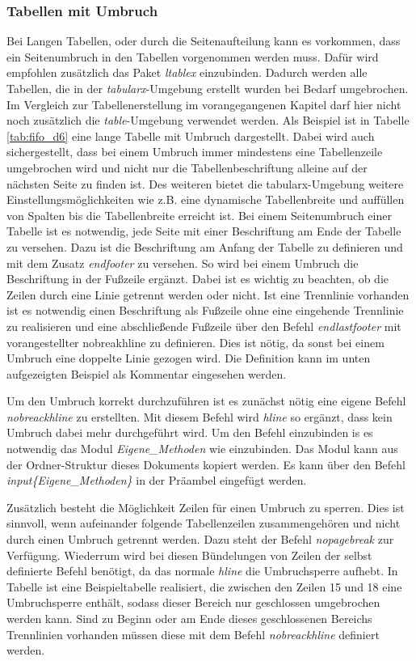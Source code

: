 		\subsubsection{Tabellen mit Umbruch}
		Bei Langen Tabellen, oder durch die Seitenaufteilung kann es vorkommen, dass ein Seitenumbruch in den Tabellen vorgenommen werden muss. Dafür wird empfohlen zusätzlich das Paket \textit{ltablex} einzubinden. Dadurch werden alle Tabellen, die in der \textit{tabularx}-Umgebung erstellt wurden bei Bedarf umgebrochen. Im Vergleich zur Tabellenerstellung im vorangegangenen Kapitel darf hier nicht noch zusätzlich die \textit{table}-Umgebung verwendet werden. Als Beispiel ist in Tabelle \ref{tab:fifo_d6} eine lange Tabelle mit Umbruch dargestellt. Dabei wird auch sichergestellt, dass bei einem Umbruch immer mindestens eine Tabellenzeile umgebrochen wird und nicht nur die Tabellenbeschriftung alleine auf der nächsten Seite zu finden ist. Des weiteren bietet die  tabularx-Umgebung weitere Einstellungsmöglichkeiten wie z.B. eine dynamische Tabellenbreite und auffüllen von Spalten bis die Tabellenbreite erreicht ist. Bei einem Seitenumbruch einer Tabelle ist es notwendig, jede Seite mit einer Beschriftung am Ende der Tabelle zu versehen. Dazu ist die Beschriftung am Anfang der Tabelle zu definieren und mit dem Zusatz \textit{endfooter} zu versehen. So wird bei einem Umbruch die Beschriftung in der Fußzeile ergänzt. Dabei ist es wichtig zu beachten, ob die Zeilen durch eine Linie getrennt werden oder nicht. Ist eine Trennlinie vorhanden ist es notwendig einen Beschriftung als Fußzeile ohne eine eingehende Trennlinie zu realisieren und eine abschließende Fußzeile über den Befehl \textit{endlastfooter} mit vorangestellter nobreakhline zu definieren. Dies ist nötig, da sonst bei einem Umbruch eine doppelte Linie gezogen wird. Die Definition kann im unten aufgezeigten Beispiel als Kommentar eingesehen werden.

		Um den Umbruch korrekt durchzuführen ist es zunächst nötig eine eigene Befehl \textit{nobreackhline} zu erstellten. Mit diesem Befehl wird \textit{hline} so ergänzt, dass kein Umbruch dabei mehr durchgeführt wird. Um den Befehl einzubinden is es notwendig das Modul \textit{Eigene\_Methoden} wie einzubinden. Das Modul kann aus der Ordner-Struktur dieses Dokuments kopiert werden. Es kann über den Befehl \textit{input\{Eigene\_Methoden\}} in der Präambel eingefügt werden.

		Zusätzlich besteht die Möglichkeit Zeilen für einen Umbruch zu sperren. Dies ist sinnvoll, wenn aufeinander folgende Tabellenzeilen zusammengehören und nicht durch einen Umbruch getrennt werden. Dazu steht der Befehl \textit{nopagebreak} zur Verfügung. Wiederrum wird bei diesen Bündelungen von Zeilen der selbst definierte Befehl benötigt, da das normale \textit{hline} die Umbruchsperre aufhebt. In Tabelle ist eine Beispieltabelle realisiert, die zwischen den Zeilen 15 und 18 eine Umbruchsperre enthält, sodass dieser Bereich nur geschlossen umgebrochen werden kann. Sind zu Beginn oder am Ende dieses geschlossenen Bereichs Trennlinien vorhanden müssen diese mit dem Befehl \textit{nobreackhline} definiert werden.


